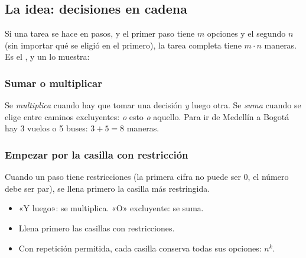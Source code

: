 

\subsection{La idea: decisiones en cadena}
Si una tarea se hace en pasos, y el primer paso tiene $m$ opciones y el segundo $n$ (sin importar qué se eligió en el
primero), la tarea completa tiene $m \cdot n$ maneras. Es el , y un  lo
muestra:


\subsubsection{Sumar o multiplicar}
Se \emph{multiplica} cuando hay que tomar una decisión \emph{y} luego otra. Se \emph{suma} cuando se elige entre caminos
excluyentes: \emph{o} esto \emph{o} aquello. Para ir de Medellín a Bogotá hay 3 vuelos o 5 buses: $3 + 5 = 8$ maneras.

\subsubsection{Empezar por la casilla con restricción}
Cuando un paso tiene restricciones (la primera cifra no puede ser 0, el número debe ser par), se llena primero la casilla
más restringida.

\begin{regla}
\begin{itemize}
  \item «Y luego»: se multiplica. «O» excluyente: se suma.
  \item Llena primero las casillas con restricciones.
  \item Con repetición permitida, cada casilla conserva todas sus opciones: $n^k$.
\end{itemize}
\end{regla}

